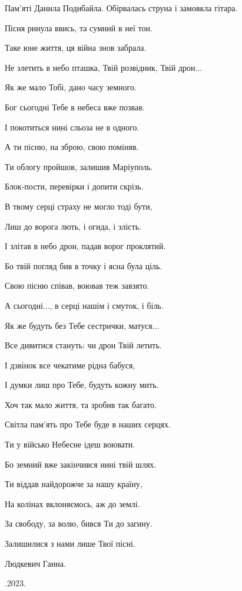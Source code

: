 Пам'яті Данила Подибайла.
\mediumskip
Обірвалась струна і замовкла гітара.\par
Пісня ринула ввись, та сумний в неї тон.\par
Таке юне життя, ця війна знов забрала.\par
Не злетить в небо пташка, Твій розвідник, Твій дрон...\par
Як же мало Тобі, дано часу земного.\par
\mediumskip
Бог сьогодні Тебе в небеса вже позвав.\par
І покотиться нині сльоза не в одного.\par
А ти пісню, на зброю, свою поміняв. \par
Ти облогу пройшов, залишив Маріуполь. \par
\mediumskip
Блок-пости, перевірки і допити скрізь.\par
В твому серці страху не могло тоді бути, \par
Лиш до ворога лють, і огида, і злість.\par
І злітав в небо дрон, падав ворог проклятий.\par
\mediumskip
Бо твій погляд бив в точку і ясна була ціль.\par
Свою пісню співав, воював теж завзято.\par
А сьогодні..., в серці нашім і смуток, і біль.\par
Як же будуть без  Тебе сестрички, матуся... \par
\mediumskip
Все дивитися стануть: чи дрон Твій летить.\par
І дзвінок все чекатиме рідна бабуся,\par
І думки лиш про Тебе, будуть кожну мить.\par
Хоч так мало життя, та зробив так багато.\par
\mediumskip
Світла пам'ять про Тебе буде в наших серцях.\par
Ти у військо Небесне ідеш воювати.\par
Бо земний вже закінчився нині твій шлях.\par
Ти віддав найдорожче за нашу країну, \par
На колінах вклоняємось, аж до землі.\par
\mediumskip
За свободу, за волю, бився Ти до загину.\par
Залишилися з нами лише Твої пісні.\par
\mediumskip
Людкевич Ганна. \par
{}.2023.

